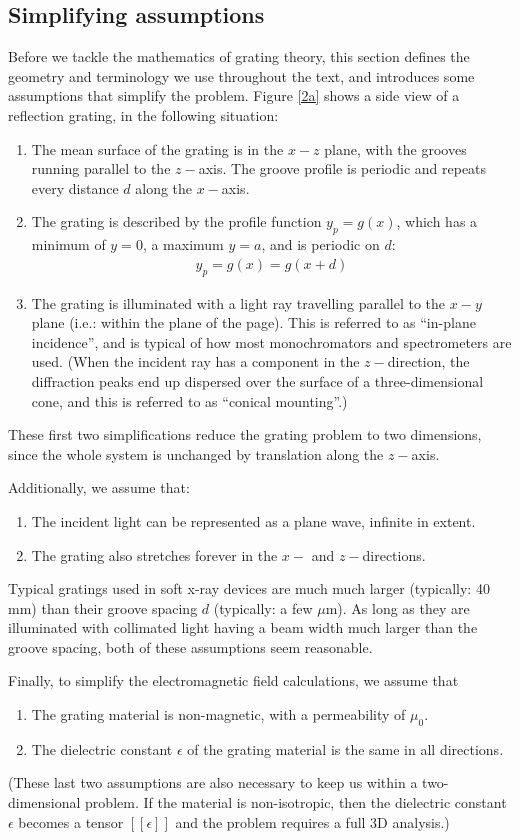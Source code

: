 \subsection{Simplifying assumptions}
\label{s_assumptions}
Before we tackle the mathematics of grating theory, this section defines the geometry and terminology we use throughout the text, and introduces some assumptions that simplify the problem.  Figure \ref{2a} shows a side view of a reflection grating, in the following situation:
\begin{enumerate}
\item The mean surface of the grating is in the $x-z$ plane, with the grooves running parallel to the $z-$axis.  The groove profile is periodic and repeats every distance $d$ along the $x-$axis.
\item The grating is described by the profile function $y_p = g(x)$, which has a minimum of $y=0$, a maximum $y=a$, and is periodic on $d$:
\begin{align}
y_p = g(x) = g(x+d)
\end{align}
\item The grating is illuminated with a light ray travelling parallel to the $x-y$ plane (i.e.: within the plane of the page). This is referred to as ``in-plane incidence'', and is typical of how most monochromators and spectrometers are used.  (When the incident ray has a component in the $z-$direction, the diffraction peaks end up dispersed over the surface of a three-dimensional cone, and this is referred to as ``conical mounting''.)
\end{enumerate}
These first two simplifications reduce the grating problem to two dimensions, since the whole system is unchanged by translation along the $z-$axis.

Additionally, we assume that:
\begin{enumerate}
\item The incident light can be represented as a plane wave, infinite in extent.  
\item The grating also stretches forever in the $x-$ and $z-$directions.

\end{enumerate}
Typical gratings used in soft x-ray devices are much much larger (typically: 40 mm) than their groove spacing $d$ (typically: a few $\mu$m).  As long as they are illuminated with collimated light having a beam width much larger than the groove spacing, both of these assumptions seem reasonable.

Finally, to simplify the electromagnetic field calculations, we assume that
\begin{enumerate}
\item The grating material is non-magnetic, with a permeability of $\mu_0$.
\item The dielectric constant $\epsilon$ of the grating material is the same in all directions.
\end{enumerate}
(These last two assumptions are also necessary to keep us within a two-dimensional problem.  If the material is non-isotropic, then the dielectric constant $\epsilon$ becomes a tensor $\left[\left[\epsilon\right]\right]$ and the problem requires a full 3D analysis.)

